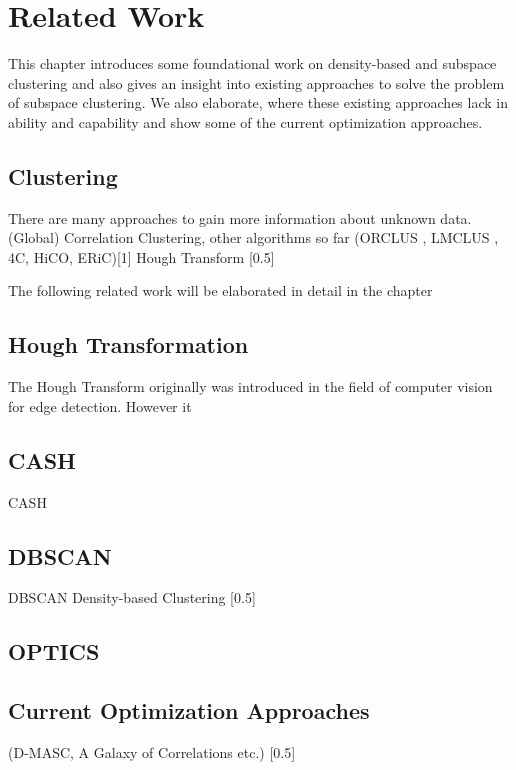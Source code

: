 \chapter{Related Work}
\label{sec:Related Work}
This chapter introduces some foundational work on density-based and subspace clustering and also gives an insight into existing approaches to solve the problem of subspace clustering. We also elaborate, where these existing approaches lack in ability and capability and show some of the current optimization approaches.

\section{Clustering}
There are many approaches to gain more information about unknown data. 
(Global) Correlation Clustering, other algorithms so far (ORCLUS \cite{orclusaggarwal2000finding}, LMCLUS \cite{}, 4C, HiCO, ERiC)[1]
Hough Transform [0.5]

The following related work will be elaborated in detail in the chapter 

\section{Hough Transformation}
The Hough Transform originally was introduced in the field of computer vision for edge detection. However it 

\section{CASH}
\ac{CASH}
\cite{CASHachtert2008robust}

\section{DBSCAN}
\ac{DBSCAN}
Density-based Clustering [0.5]

\section{OPTICS}
\cite{opticsankerst1999optics}

\section{Current Optimization Approaches}
    (D-MASC\cite{kazempour2018d, kazempour2019galaxy}, A Galaxy of Correlations etc.) [0.5]
    
